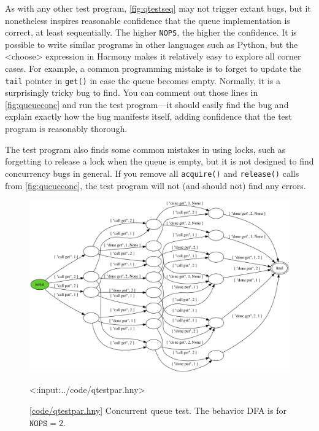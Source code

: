 \documentclass{report}
\newcommand{\harmonylink}[1]{%
[\href{https://harmony.cs.cornell.edu/#1}{\underline{#1}}]%
}
\newenvironment{code}{
\tcolorbox
}{
\endtcolorbox
}
\begin{document}
As with any other test program,
\autoref{fig:qtestseq} may not trigger extant bugs, but
it nonetheless inspires reasonable confidence that the
queue implementation is correct, at least sequentially.
The higher \texttt{NOPS}, the higher the confidence.
It is possible to write similar programs in other languages
such as Python, but the <{choose}> expression in Harmony
makes it relatively easy to explore all corner cases.
%
For example, a common programming mistake is to forget to
update the \texttt{tail} pointer in \texttt{get()} in case
the queue becomes empty.  Normally, it is a surprisingly
tricky bug to find.  You can comment out those lines
in \autoref{fig:queueconc} and run the test program---it should
easily find the bug and explain exactly how
the bug manifests itself, adding confidence that the test program
is reasonably thorough.

The test program also finds some common mistakes in using
locks, such as forgetting to release a lock when the queue
is empty, but it is not designed to find concurrency bugs
in general.  If you remove all \texttt{acquire()} and
\texttt{release()} calls from \autoref{fig:queueconc},
the test program will not (and should not)
find any errors.

\begin{figure}
\begin{center}
\includegraphics[width=\textwidth]{figures/qtestpar.png}
\end{center}
\begin{code}
<{:input:../code/qtestpar.hny}>
\end{code}
\caption{\harmonylink{code/qtestpar.hny} Concurrent queue test.  The
behavior DFA is for $\mathtt{NOPS} = 2$.}
\label{fig:qtestpar}
\end{figure}
\end{document}
